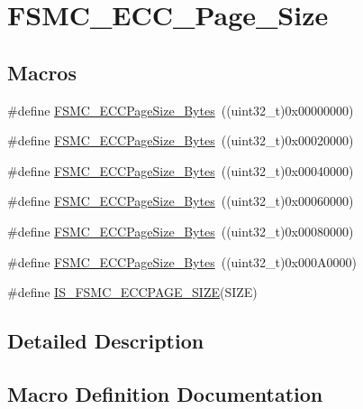 \hypertarget{group___f_s_m_c___e_c_c___page___size}{}\section{F\+S\+M\+C\+\_\+\+E\+C\+C\+\_\+\+Page\+\_\+\+Size}
\label{group___f_s_m_c___e_c_c___page___size}
\subsection*{Macros}
\begin{DoxyCompactItemize}
\item 
\#define \mbox{\hyperlink{group___f_s_m_c___e_c_c___page___size_gaaa1661267b44e6728fa64aca79de54b3}{F\+S\+M\+C\+\_\+\+E\+C\+C\+Page\+Size\+\_\+Bytes}}~((uint32\+\_\+t)0x00000000)
\item 
\#define \mbox{\hyperlink{group___f_s_m_c___e_c_c___page___size_gacb4da17c28dde89e38ff4ed40497f6b5}{F\+S\+M\+C\+\_\+\+E\+C\+C\+Page\+Size\+\_\+Bytes}}~((uint32\+\_\+t)0x00020000)
\item 
\#define \mbox{\hyperlink{group___f_s_m_c___e_c_c___page___size_ga8137931c96b63ec7e6f80a8c7391433f}{F\+S\+M\+C\+\_\+\+E\+C\+C\+Page\+Size\+\_\+Bytes}}~((uint32\+\_\+t)0x00040000)
\item 
\#define \mbox{\hyperlink{group___f_s_m_c___e_c_c___page___size_gab8f3ae95becd59e71a976b97ded904b8}{F\+S\+M\+C\+\_\+\+E\+C\+C\+Page\+Size\+\_\+Bytes}}~((uint32\+\_\+t)0x00060000)
\item 
\#define \mbox{\hyperlink{group___f_s_m_c___e_c_c___page___size_gaec2e9e434685a1756bd171699248f65a}{F\+S\+M\+C\+\_\+\+E\+C\+C\+Page\+Size\+\_\+Bytes}}~((uint32\+\_\+t)0x00080000)
\item 
\#define \mbox{\hyperlink{group___f_s_m_c___e_c_c___page___size_gab6877a99ddf02e7aa95cf04896ce731d}{F\+S\+M\+C\+\_\+\+E\+C\+C\+Page\+Size\+\_\+Bytes}}~((uint32\+\_\+t)0x000\+A0000)
\item 
\#define \mbox{\hyperlink{group___f_s_m_c___e_c_c___page___size_ga58fefa0d55875775a88f54ad7498178f}{I\+S\+\_\+\+F\+S\+M\+C\+\_\+\+E\+C\+C\+P\+A\+G\+E\+\_\+\+S\+I\+ZE}}(S\+I\+ZE)
\end{DoxyCompactItemize}


\subsection{Detailed Description}


\subsection{Macro Definition Documentation}
\mbox{\label{group___f_s_m_c___e_c_c___page___size_ga8137931c96b63ec7e6f80a8c7391433f}} 
